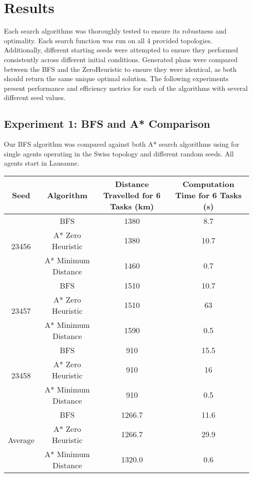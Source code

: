 \documentclass[11pt]{article}
\begin{document}
\section{Results}
Each search algorithms was thoroughly tested to ensure its robustness and optimality. Each search function was run on all 4 provided topologies. Additionally, different starting seeds were attempted to ensure they performed consistently across different initial conditions. Generated plans were compared between the BFS and the ZeroHeuristic to ensure they were identical, as both should return the same unique optimal solution. The following experiments present performance and efficiency metrics for each of the algorithms with several different seed values. 
\subsection{Experiment 1: BFS and A* Comparison}
Our BFS algorithm was compared against both A* search algorithms using for single agents operating in the Swiss topology and different random seeds. All agents start in Lausanne. 

\begin{table}[]
	\begin{tabular}{|c|c|c|c|}
		\hline
		Seed & Algorithm & Distance Travelled  for 6 Tasks (km) & Computation Time for 6 Tasks (s) \\ \hline
		\multirow{3}{*}{23456} & BFS & 1380 & 8.7 \\ \cline{2-4} 
		& A* Zero Heuristic & 1380 & 10.7 \\ \cline{2-4} 
		& A* Minimum Distance & 1460 & 0.7 \\ \hline
		\multirow{3}{*}{23457} & BFS & 1510 & 10.7 \\ \cline{2-4} 
		& A* Zero Heuristic & 1510 & 63 \\ \cline{2-4} 
		& A* Minimum Distance & 1590 & 0.5 \\ \hline
		\multirow{3}{*}{23458} & BFS & 910 & 15.5 \\ \cline{2-4} 
		& A* Zero Heuristic & 910 & 16 \\ \cline{2-4} 
		& A* Minimum Distance & 910 & 0.5 \\ \hline
		\multirow{3}{*}{Average} & BFS & 1266.7 & 11.6 \\ \cline{2-4} 
		& A* Zero Heuristic & 1266.7 & 29.9 \\ \cline{2-4} 
		& A* Minimum Distance & 1320.0 & 0.6 \\ \hline
	\end{tabular}
\end{table}
\end{document}
